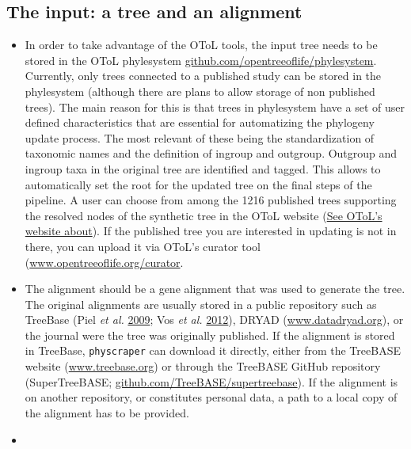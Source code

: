 \documentclass[]{article}
\providecommand{\tightlist}{%
  \setlength{\itemsep}{0pt}\setlength{\parskip}{0pt}}
\begin{document}
\hypertarget{the-input-a-tree-and-an-alignment}{%
\subsection{The input: a tree and an alignment}\label{the-input-a-tree-and-an-alignment}}

\begin{itemize}
\tightlist
\item
  In order to take advantage of the OToL tools, the input tree needs to be stored in the
  OToL phylesystem \href{https://github.com/opentreeoflife/phylesystem}{github.com/opentreeoflife/phylesystem}.
  Currently, only trees connected to
  a published study can be stored in the phylesystem (although there are plans to
  allow storage of non published trees). The main
  reason for this is that trees in phylesystem have a set of user defined characteristics
  that are essential for automatizing the phylogeny update process. The most relevant of these being the standardization of taxonomic names and the definition of ingroup and outgroup. Outgroup and ingroup taxa in the original tree are identified and tagged. This allows to automatically set the root for the updated tree on the final steps of the pipeline.
  A user can choose from among the 1216 published trees supporting the resolved nodes of the synthetic tree in the OToL website (\href{https://tree.opentreeoflife.org/about/synthesis-release/v12.3}{See OToL's website about}). If the published tree you are interested in updating is not in there, you can upload it via OToL's curator tool (\href{https://tree.opentreeoflife.org/curator}{www.opentreeoflife.org/curator}.
\item
  The alignment should be a gene alignment that was used to generate the tree. The original
  alignments are usually stored in a public repository such as TreeBase (Piel \emph{et al.} \protect\hyperlink{ref-piel2009treebase}{2009}; Vos \emph{et al.} \protect\hyperlink{ref-vos2012nexml}{2012}),
  DRYAD (\href{http://datadryad.org/}{www.datadryad.org}), or the journal were the tree was originally published.
  If the alignment is stored in TreeBase, \texttt{physcraper} can download it directly,
  either from the TreeBASE website (\href{https://treebase.org/}{www.treebase.org})
  or through the TreeBASE GitHub repository (SuperTreeBASE; \href{https://github.com/TreeBASE/supertreebase}{github.com/TreeBASE/supertreebase}).
  If the alignment is on another repository, or constitutes personal data, a path to a local copy of the alignment has to be provided.
\item

\end{itemize}
\end{document}
